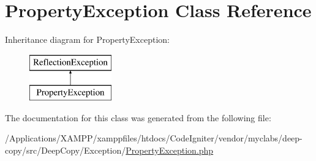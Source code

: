 \hypertarget{class_deep_copy_1_1_exception_1_1_property_exception}{}\section{Property\+Exception Class Reference}
\label{class_deep_copy_1_1_exception_1_1_property_exception}
Inheritance diagram for Property\+Exception\+:\begin{figure}[H]
\begin{center}
\leavevmode
\includegraphics[height=2.000000cm]{class_deep_copy_1_1_exception_1_1_property_exception}
\end{center}
\end{figure}


The documentation for this class was generated from the following file\+:\begin{DoxyCompactItemize}
\item 
/\+Applications/\+X\+A\+M\+P\+P/xamppfiles/htdocs/\+Code\+Igniter/vendor/myclabs/deep-\/copy/src/\+Deep\+Copy/\+Exception/\mbox{\hyperlink{_property_exception_8php}{Property\+Exception.\+php}}\end{DoxyCompactItemize}
